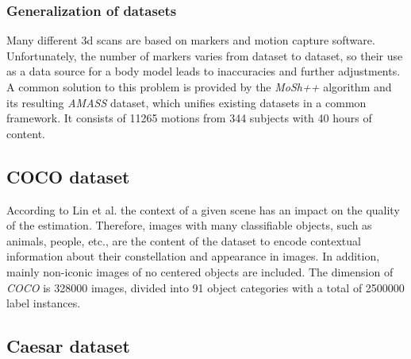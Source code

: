 \subsubsection{Generalization of datasets}
Many different 3d scans are based on markers and motion capture software. Unfortunately, the number of markers varies from dataset to dataset, so their use as a data source for a body model leads to inaccuracies and further adjustments. A common solution to this problem is provided by the \emph{MoSh++} algorithm and its resulting \emph{AMASS} dataset, which unifies existing datasets in a common framework. It consists of 11265 motions from 344 subjects with 40 hours of content.\cite{amass}

\subsection{COCO dataset} 
According to Lin et al. the context of a given scene has an impact on the quality of the estimation. Therefore, images with many classifiable objects, such as animals, people, etc., are the content of the dataset to encode contextual information about their constellation and appearance in images. In addition, mainly non-iconic images of no centered objects are included. The dimension of \emph{COCO} is 328000 images, divided into 91 object categories with a total of 2500000 label instances. \cite{coco}

\subsection{Caesar dataset}
\cite{caesar}